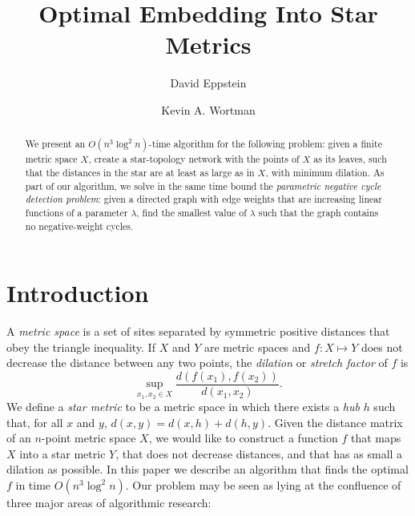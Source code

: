\documentclass{llncs}
\begin{document}
\lstset{language=Python}

\title{Optimal Embedding Into Star Metrics}

\author{David Eppstein \and Kevin A. Wortman}




\maketitle

\begin{abstract}
We  present an $O(n^3 \log^2 n)$-time algorithm for  the following problem: given a finite metric space $X$, create a star-topology network with the points of $X$ as its leaves, such that the distances in the star are at least as large as in $X$, with minimum dilation. As part of our algorithm, we solve in the same time bound the \emph{parametric negative cycle detection problem}: given a directed graph with edge weights that are increasing linear functions of a parameter $\lambda$, find the smallest value of $\lambda$ such that the graph contains no negative-weight cycles.
\end{abstract}

\section{Introduction}
\label{section:introduction}
A \emph{metric space} is a set of sites separated by symmetric positive distances that obey the triangle inequality. If $X$ and $Y$ are metric spaces and $f:X\mapsto Y$ does not decrease the distance between any two points, the \emph{dilation} or \emph{stretch factor} of $f$ is
$$\sup_{x_1,x_2\in X}\frac{d(f(x_1),f(x_2))}{d(x_1,x_2)}.$$
We define a \emph{star metric} to be a metric space in which there exists a \emph{hub} $h$ such that, for all $x$ and $y$, $d(x,y)=d(x,h)+d(h,y)$. Given the distance matrix of an $n$-point metric space $X$, we would like to construct a function $f$ that maps $X$ into a star metric $Y$, that does not decrease distances, and that has as small a dilation as possible. In this paper we describe an algorithm that finds the optimal $f$ in time $O(n^3 \log^2 n)$.
Our problem may be seen as lying at the confluence of three major areas of algorithmic research:
\end{document}
